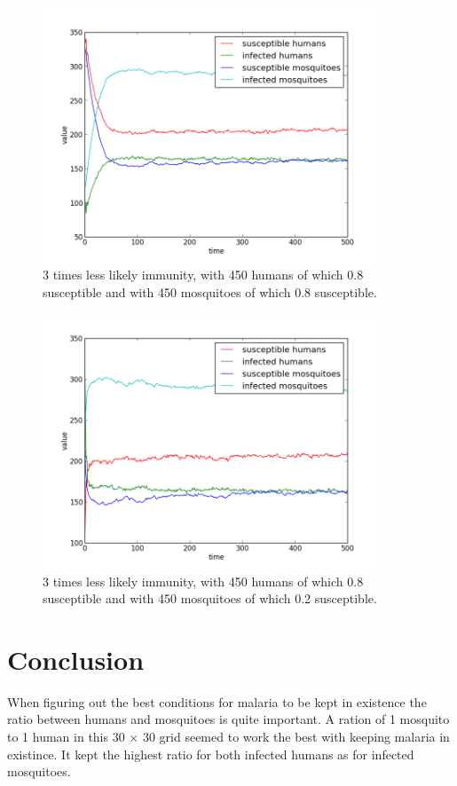 \documentclass[a4paper]{report}
\begin{document}
\begin{figure}[htbp]
    \centering
    \includegraphics[width=0.9\textwidth]{less_immunity_05_08_05_08.png}
    \caption{3 times less likely immunity, with 450 humans of which 0.8
        susceptible and with 450 mosquitoes of which 0.8 susceptible.
    }
    \label{fig:less_immunity_05_08_05_02}
\end{figure}

\begin{figure}[htbp]
    \centering
    \includegraphics[width=0.9\textwidth]{less_immunity_05_08_05_02.png}
    \caption{3 times less likely immunity, with 450 humans of which 0.8
        susceptible and with 450 mosquitoes of which 0.2 susceptible.
    }
    \label{fig:2_more_mosquitoes}
\end{figure}


\section{Conclusion}
When figuring out the best conditions for malaria to be kept in existence the
ratio between humans and mosquitoes is quite important. A ration of 1 mosquito
to 1 human in this 30 $\times$ 30 grid seemed to work the best with keeping
malaria in existince. It kept the highest ratio for both infected humans as for
infected mosquitoes.
\end{document}
